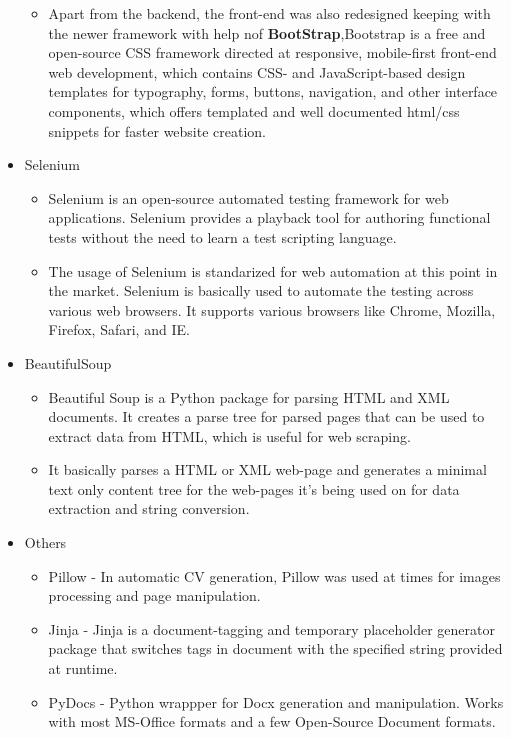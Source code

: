 \documentclass[14pt]{extarticle}
\begin{document}
\begin{itemize}
\begin{itemize}
        \item \par Apart from the backend, the front-end was also redesigned keeping with the newer framework with help nof \textbf{BootStrap},Bootstrap is a free and open-source CSS framework directed at responsive, mobile-first front-end web development, which contains CSS- and JavaScript-based design templates for typography, forms, buttons, navigation, and other interface components, which offers templated and well documented html/css snippets for faster website creation.
    \end{itemize}
    \item Selenium
     \begin{itemize}
        \item \par Selenium is an open-source automated testing framework for web applications. Selenium provides a playback tool for authoring functional tests without the need to learn a test scripting language.
        \item \par The usage of Selenium is standarized for web automation at this point in the market. Selenium is basically used to automate the testing across various web browsers. It supports various browsers like Chrome, Mozilla, Firefox, Safari, and IE.
    \end{itemize}
    \item BeautifulSoup
    \begin{itemize}
        \item Beautiful Soup is a Python package for parsing HTML and XML documents. It creates a parse tree for parsed pages that can be used to extract data from HTML, which is useful for web scraping.
        \item It basically parses a HTML or XML web-page and generates a minimal text only content tree for the web-pages it's being used on for data extraction and string conversion.
    \end{itemize}
    \item Others
    \begin{itemize}
        \item Pillow - In automatic CV generation, Pillow was used at times for images processing and page manipulation.
        \item Jinja - Jinja is a document-tagging and temporary placeholder generator package that switches tags in document with the specified string provided at runtime.
        \item PyDocs - Python wrappper for Docx generation and manipulation. Works with most MS-Office formats and a few Open-Source Document formats.
    \end{itemize}
\end{itemize}
\end{document}
